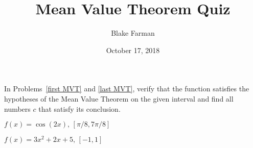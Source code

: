 \documentclass[10pt]{amsart}
\title[Mean Value Theorem]{Mean Value Theorem Quiz}
\date{October 17, 2018}
\author{Blake Farman}
\begin{document}
\maketitle

\makenameslot

In Problems~\ref{first MVT} and \ref{last MVT}, verify that the function satisfies the hypotheses of the Mean Value Theorem on the given interval and find all numbers \(c\) that satisfy its conclusion.

\begin{thm}\label{first MVT}
  \(f(x) = \cos(2x),\, [\pi/8, 7\pi/8]\)
\end{thm}

\vspace{2.5in}

\begin{thm}\label{last MVT}
    \(f(x) = 3x^2 + 2x + 5,\, [-1,1]\)
\end{thm}
\end{document}
